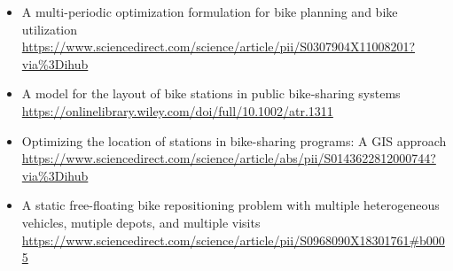 \documentclass[12pt]{article}
\begin{document}
\begin{itemize}
\item A multi-periodic optimization formulation for bike planning and bike utilization \\ \url{https://www.sciencedirect.com/science/article/pii/S0307904X11008201?via%3Dihub} \ \\
\item A model for the layout of bike stations in public bike‐sharing systems \\\url{https://onlinelibrary.wiley.com/doi/full/10.1002/atr.1311}\ \\ 
\item Optimizing the location of stations in bike-sharing programs: A GIS approach \\ \url{https://www.sciencedirect.com/science/article/abs/pii/S0143622812000744?via\%3Dihub} \\
\item A static free-floating bike repositioning problem with multiple heterogeneous vehicles, mutiple depots, and multiple visits \\
\url{https://www.sciencedirect.com/science/article/pii/S0968090X18301761#b0005}
\end{itemize}
\end{document}
